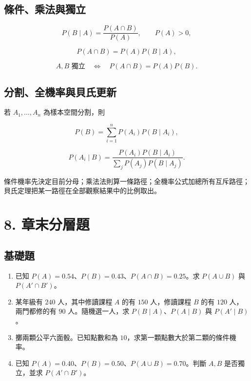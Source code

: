 \documentclass[11pt,a4paper]{article}
\begin{document}
\subsection{條件、乘法與獨立}\label{ux689dux4ef6ux4e58ux6cd5ux8207ux7368ux7acb}

\[
P(B\mid A)=\frac{P(A\cap B)}{P(A)},
\qquad P(A)>0,
\]

\[
P(A\cap B)=P(A)P(B\mid A),
\]

\[
A,B\text{ 獨立}
\quad\Longleftrightarrow\quad
P(A\cap B)=P(A)P(B).
\]

\subsection{分割、全機率與貝氏更新}\label{ux5206ux5272ux5168ux6a5fux7387ux8207ux8c9dux6c0fux66f4ux65b0}

若 \(A_1,\ldots,A_n\) 為樣本空間分割，則

\[
P(B)=\sum_{i=1}^{n}P(A_i)P(B\mid A_i),
\]

\[
P(A_i\mid B)
=\frac{P(A_i)P(B\mid A_i)}
{\sum_jP(A_j)P(B\mid A_j)}.
\]

條件機率先決定目前分母；乘法法則算一條路徑；全機率公式加總所有互斥路徑；貝氏定理把某一路徑在全部觀察結果中的比例取出。

\section{8. 章末分層題}\label{ux7ae0ux672bux5206ux5c64ux984c}

\subsection{基礎題}\label{ux57faux790eux984c}

\begin{enumerate}
\def\labelenumi{\arabic{enumi}.}
\item
  已知 \(P(A)=0.54\)、\(P(B)=0.43\)、\(P(A\cap B)=0.25\)。求 \(P(A\cup B)\) 與 \(P(A'\cap B')\)。
\item
  某年級有 \(240\) 人，其中修讀課程 \(A\) 的有 \(150\) 人，修讀課程 \(B\) 的有 \(120\) 人，兩門都修的有 \(90\) 人。隨機選一人，求 \(P(B\mid A)\)、\(P(A\mid B)\) 與 \(P(A'\mid B)\)。
\item
  擲兩顆公平六面骰。已知點數和為 \(10\)，求第一顆點數大於第二顆的條件機率。
\item
  已知 \(P(A)=0.40\)、\(P(B)=0.50\)、\(P(A\cup B)=0.70\)。判斷 \(A,B\) 是否獨立，並求 \(P(A'\cap B')\)。
\end{enumerate}
\end{document}
